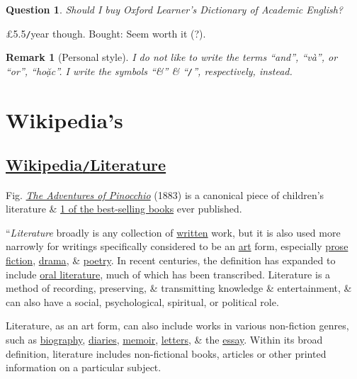 \documentclass[oneside]{book}
\numberwithin{equation}{section}
\newtheorem{question}{Question}[chapter]
\newtheorem{remark}{Remark}[chapter]
\begin{document}
\begin{question}
	Should I buy Oxford Learner's Dictionary of Academic English?
\end{question}
\pounds 5.5\texttt{/}year though. Bought: Seem worth it (?).

\begin{remark}[Personal style]
	I do not like to write the terms ``and'', ``và'', or ``or'', ``hoặc''. I write the symbols ``\&'' \& ``\emph{\texttt{/}}'', respectively, instead.
\end{remark}


\chapter{Wikipedia's}

\section{\href{https://en.wikipedia.org/wiki/Literature}{Wikipedia\texttt{/}Literature}}
\textsf{Fig. \href{https://en.wikipedia.org/wiki/The_Adventures_of_Pinocchio}{\textit{The Adventures of Pinocchio}} (1883) is a canonical piece of children's literature \& \href{https://en.wikipedia.org/wiki/List_of_best-selling_books}{1 of the best-selling books} ever published.}

``\textit{Literature} broadly is any collection of \href{https://en.wikipedia.org/wiki/Writing}{written} work, but it is also used more narrowly for writings specifically considered to be an \href{https://en.wikipedia.org/wiki/Art}{art} form, especially \href{https://en.wikipedia.org/wiki/Prose}{prose} \href{https://en.wikipedia.org/wiki/Fiction}{fiction}, \href{https://en.wikipedia.org/wiki/Drama}{drama}, \& \href{https://en.wikipedia.org/wiki/Poetry}{poetry}. In recent centuries, the definition has expanded to include \href{https://en.wikipedia.org/wiki/Oral_literature}{oral literature}, much of which has been transcribed. Literature is a method of recording, preserving, \& transmitting knowledge \& entertainment, \& can also have a social, psychological, spiritual, or political role.

Literature, as an art form, can also include works in various non-fiction genres, such as \href{https://en.wikipedia.org/wiki/Biography}{biography}, \href{https://en.wikipedia.org/wiki/Diary}{diaries}, \href{https://en.wikipedia.org/wiki/Memoir}{memoir}, \href{https://en.wikipedia.org/wiki/Letter_(message)}{letters}, \& the \href{https://en.wikipedia.org/wiki/Essay}{essay}. Within its broad definition, literature includes non-fictional books, articles or other printed information on a particular subject.
\end{document}
